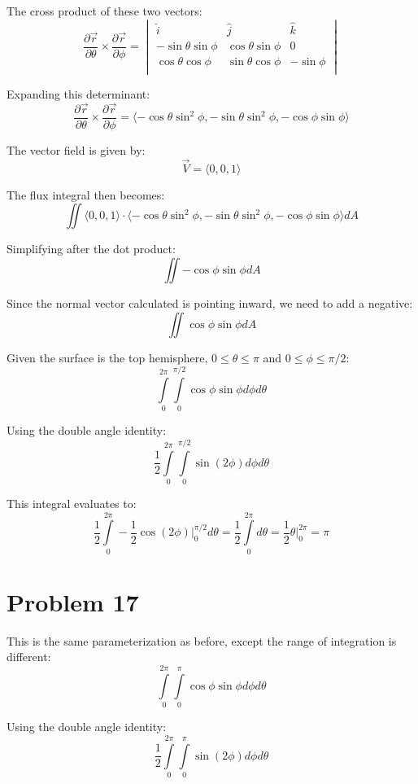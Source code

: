 \documentclass{article}
\begin{document}
The cross product of these two vectors:
$$ \frac{\partial \vec{r}}{\partial \theta} \times \frac{\partial
\vec{r}}{\partial \phi} =
\begin{vmatrix}
  \hat{i} & \hat{j} & \hat{k} \\
  -\sin \theta \sin \phi & \cos \theta \sin \phi & 0 \\
  \cos \theta \cos \phi & \sin \theta \cos \phi & - \sin \phi \\
\end{vmatrix} $$

Expanding this determinant:
$$ \frac{\partial \vec{r}}{\partial \theta} \times \frac{\partial
\vec{r}}{\partial \phi} = \langle -\cos \theta \sin^2 \phi, -\sin \theta \sin^2
\phi, -\cos \phi \sin \phi \rangle $$

The vector field is given by:
$$ \vec{V} = \langle 0, 0, 1 \rangle $$

The flux integral then becomes:
$$ \iint \langle 0, 0, 1 \rangle \cdot \langle -\cos \theta \sin^2 \phi, -\sin
\theta \sin^2 \phi, -\cos \phi \sin \phi \rangle dA $$

Simplifying after the dot product:
$$ \iint - \cos \phi \sin \phi dA $$

Since the normal vector calculated is pointing inward, we need to add a
negative:
$$ \iint \cos \phi \sin \phi dA $$

Given the surface is the top hemisphere, $0 \leq \theta \leq \pi$ and $0 \leq
\phi \leq \pi / 2$:
$$ \int\limits_0^{2\pi}\int\limits_0^{\pi/2} \cos \phi \sin \phi d\phi d\theta
$$

Using the double angle identity:
$$ \frac{1}{2} \int\limits_0^{2\pi}\int\limits_0^{\pi/2} \sin(2\phi) d\phi
d\theta $$

This integral evaluates to:
$$ \frac{1}{2} \int\limits_0^{2\pi} -\frac{1}{2} \cos(2\phi) \bigg\vert_0^{\pi/2} d\theta
= \frac{1}{2} \int\limits_0^{2\pi} d\theta = \frac{1}{2} \theta \bigg\vert_0^{2\pi} = \pi $$

\section*{Problem 17}

This is the same parameterization as before, except the range of integration is
different:
$$ \int\limits_0^{2\pi}\int\limits_0^{\pi} \cos \phi \sin \phi d\phi d\theta$$

Using the double angle identity:
$$ \frac{1}{2} \int\limits_0^{2\pi}\int\limits_0^{\pi} \sin(2\phi) d\phi
d\theta $$
\end{document}
